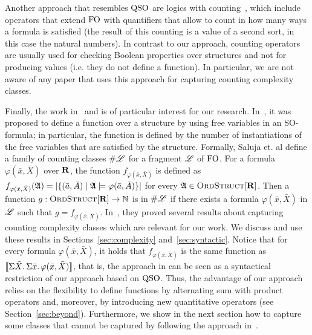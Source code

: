 Another approach that resembles ${\rm QSO}$ are logics with counting~\cite{IL90,E97,GG98,L04}, which include operators that extend ${\rm FO}$ with quantifiers that allow to count in how many ways a formula  is satisfied (the result of this counting is a value of a second sort, in this case the  natural numbers). 
In contrast to our approach, counting operators are usually used for checking Boolean properties over structures and not for producing values (i.e. they do not define a function).
In particular, we are not aware of any paper that uses this approach for capturing counting complexity classes.

Finally, the work in~\cite{SalujaST95} and \cite{ComptonG96} is of particular interest for our research. 
In~\cite{SalujaST95}, it was proposed to define a function over a structure by using free variables in an SO-formula; in particular, the function is defined by the number of instantiations of the free variables that are satisfied by the structure.
Formally, Saluja et. al \cite{SalujaST95} define a family of counting classes $\#\mathscr{L}$ for a fragment $\mathscr{L}$ of ${\rm FO}$. For a formula $\varphi(\bar{x},\bar{X})$ over $\mathbf{R}$, the function $f_{\varphi(\bar x, \bar X)}$ is defined as
$
f_{\varphi(\bar x, \bar X)}(\mathfrak{A}) = \vert \{(\bar{a},\bar{A}) \mid \mathfrak{A}\models\varphi(\bar{a},\bar{A})\}\vert
$
for every $\mathfrak{A}\in\text{\sc OrdStruct}[\mathbf{R}]$. Then a function $g:\text{\sc OrdStruct}[\mathbf{R}]\to\mathbb{N}$ is in $\#\mathscr{L}$ if there exists a formula $\varphi(\bar{x},\bar{X})$ in $\mathscr{L}$ such that $g = f_{\varphi(\bar x, \bar X)}$.
In~\cite{SalujaST95}, they proved several results about capturing counting complexity classes which are relevant for our work. We discuss and use these results in Sections~\ref{sec:complexity} and~\ref{sec:syntactic}.
Notice that for every formula $\varphi(\bar{x},\bar{X})$, it holds that $f_{\varphi(\bar{x},\bar{X})}$ is the same function as ${\llbracket{}{\Sigma{\bar{X}}.\, \Sigma{\bar{x}}.\, \varphi(\bar{x},\bar{X})}\rrbracket}$, that is, the approach in \cite{SalujaST95} can be seen as a syntactical restriction of our approach based on ${\rm QSO}$. 
Thus, the advantage of our approach relies on the flexibility to define functions by alternating sum with product operators and, moreover, by introducing new quantitative operators (see Section~\ref{sec:beyond}).
Furthermore, we show in the next section how to capture some classes that cannot be captured by following the approach in~\cite{SalujaST95}.
